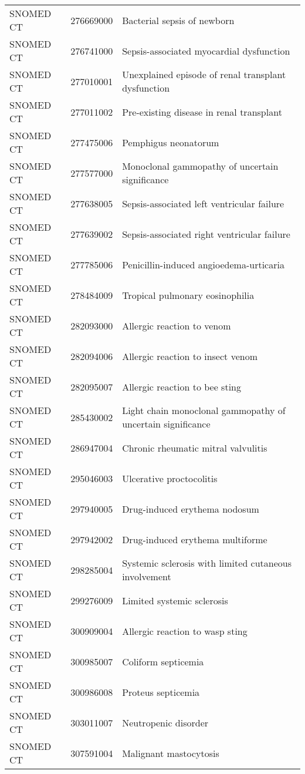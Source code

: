 \begin{longtable}{p{}p{}p{}}
  SNOMED CT & 276669000 & Bacterial sepsis of newborn \\ 
  SNOMED CT & 276741000 & Sepsis-associated myocardial dysfunction \\ 
  SNOMED CT & 277010001 & Unexplained episode of renal transplant dysfunction \\ 
  SNOMED CT & 277011002 & Pre-existing disease in renal transplant \\ 
  SNOMED CT & 277475006 & Pemphigus neonatorum \\ 
  SNOMED CT & 277577000 & Monoclonal gammopathy of uncertain significance \\ 
  SNOMED CT & 277638005 & Sepsis-associated left ventricular failure \\ 
  SNOMED CT & 277639002 & Sepsis-associated right ventricular failure \\ 
  SNOMED CT & 277785006 & Penicillin-induced angioedema-urticaria \\ 
  SNOMED CT & 278484009 & Tropical pulmonary eosinophilia \\ 
  SNOMED CT & 282093000 & Allergic reaction to venom \\ 
  SNOMED CT & 282094006 & Allergic reaction to insect venom \\ 
  SNOMED CT & 282095007 & Allergic reaction to bee sting \\ 
  SNOMED CT & 285430002 & Light chain monoclonal gammopathy of uncertain significance \\ 
  SNOMED CT & 286947004 & Chronic rheumatic mitral valvulitis \\ 
  SNOMED CT & 295046003 & Ulcerative proctocolitis \\ 
  SNOMED CT & 297940005 & Drug-induced erythema nodosum \\ 
  SNOMED CT & 297942002 & Drug-induced erythema multiforme \\ 
  SNOMED CT & 298285004 & Systemic sclerosis with limited cutaneous involvement \\ 
  SNOMED CT & 299276009 & Limited systemic sclerosis \\ 
  SNOMED CT & 300909004 & Allergic reaction to wasp sting \\ 
  SNOMED CT & 300985007 & Coliform septicemia \\ 
  SNOMED CT & 300986008 & Proteus septicemia \\ 
  SNOMED CT & 303011007 & Neutropenic disorder \\ 
  SNOMED CT & 307591004 & Malignant mastocytosis \\ 

\end{longtable}
